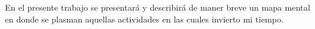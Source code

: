 En el presente trabajo se presentará y describirá de maner breve un mapa mental en donde se plasman aquellas
actividades en las cuales invierto mi tiempo.